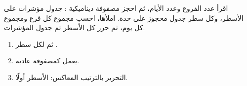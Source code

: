 \begin{statement}
اقرأ عدد الفروع وعدد الأيام، ثم احجز مصفوفة ديناميكية : جدول مؤشرات على الأسطر، وكل سطر جدول محجوز على حدة. املأها، احسب مجموع كل فرع ومجموع كل يوم، ثم حرر كل الأسطر ثم جدول المؤشرات.
\end{statement}
\begin{stepsbox}\begin{enumerate}
\item {} ثم لكل سطر .
\item {} يعمل كمصفوفة عادية.
\item التحرير بالترتيب المعاكس: الأسطر أولًا.
\end{enumerate}\end{stepsbox}
